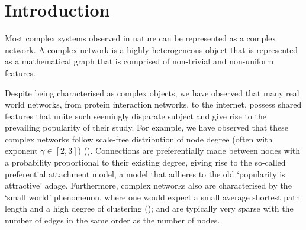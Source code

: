 \documentclass[
11pt, %
english, %
singlespacing, %
headsepline, %
]{MastersDoctoralThesis} %
\begin{document}


\mainmatter %

\pagestyle{thesis} %

%
% 
%
% 
% 

\chapter{Introduction}



Most complex systems observed in nature can be represented as a complex network. A complex network is a highly heterogeneous object that is represented as a mathematical graph that is comprised of non-trivial and non-uniform features. 



Despite being characterised as complex objects, we have observed that many real world networks, from protein interaction networks, to the internet, possess shared features that unite such seemingly disparate subject and give rise to the prevailing popularity of their study. For example, we have observed that these complex networks follow scale-free distribution of node degree (often with exponent $\gamma\in [2, 3]$) (\cite{barabasi1999emergence,barabasi2009scale}). Connections are preferentially made between nodes with a probability proportional to their existing degree, giving rise to the so-called preferential attachment model, a model that adheres to the old `popularity is attractive' adage. Furthermore, complex networks also are characterised by the `small world' phenomenon, where one would expect a small average shortest path length and a high degree of clustering (\cite{watts1998collective}); and are typically very sparse with the number of edges in the same order as the number of nodes. 
\end{document}
